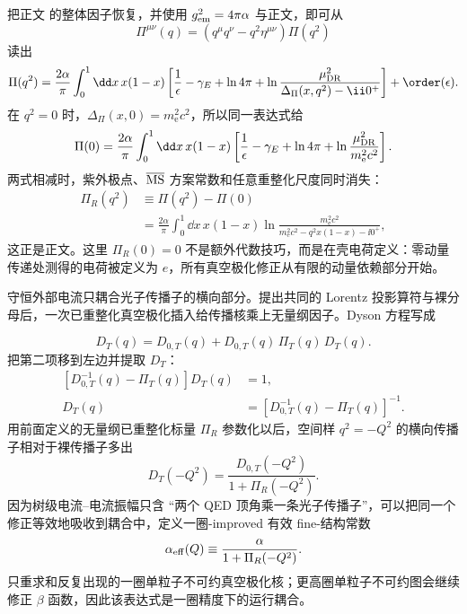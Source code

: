 \begin{derivation}
把正文 的整体因子恢复，并使用 $g_{\rm em}^2=4\pi\alpha$ 与正文，即可从
\[
\Pi^{\mu\nu}(q)
=(q^\mu q^\nu-q^2\eta^{\mu\nu})\Pi(q^2)
\]
读出
\begin{align*}
\Pi(q^2)
=\frac{2\alpha}{\pi}
\int_0^1\dd x\,x(1-x)
\left[
\frac1\epsilon-\gamma_E+\ln4\pi
+\ln\frac{\mu_{\rm DR}^2}
{\Delta_\Pi(x,q^2)-\ii0^+}
\right]
+\order(\epsilon).
\end{align*}
在 $q^2=0$ 时，$\Delta_\Pi(x,0)=m_{\mathrm e}^2c^2$，所以同一表达式给
\begin{align*}
\Pi(0)
=\frac{2\alpha}{\pi}
\int_0^1\dd x\,x(1-x)
\left[
\frac1\epsilon-\gamma_E+\ln4\pi
+\ln\frac{\mu_{\rm DR}^2}{m_{\mathrm e}^2c^2}
\right].
\end{align*}
两式相减时，紫外极点、$\overline{\rm MS}$ 方案常数和任意重整化尺度同时消失：
\begin{align*}
\Pi_R(q^2)
&\equiv\Pi(q^2)-\Pi(0)\\
&=\frac{2\alpha}{\pi}
\int_0^1\dd x\,x(1-x)
\ln\frac{m_{\mathrm e}^2c^2}
{m_{\mathrm e}^2c^2-q^2x(1-x)-\ii0^+},
\end{align*}
这正是正文。这里 $\Pi_R(0)=0$ 不是额外代数技巧，而是在壳电荷定义：零动量传递处测得的电荷被定义为 $e$，所有真空极化修正从有限的动量依赖部分开始。
\end{derivation}


\begin{derivation}
守恒外部电流只耦合光子传播子的横向部分。提出共同的 Lorentz 投影算符与裸分母后，一次已重整化真空极化插入给传播核乘上无量纲因子。Dyson 方程写成

\begin{equation*}
 D_T(q)=D_{0,T}(q)+D_{0,T}(q)\,\Pi_T(q)\,D_T(q).
 \end{equation*}
把第二项移到左边并提取 $D_T$：
\begin{align*}
 \left[D_{0,T}^{-1}(q)-\Pi_T(q)\right]D_T(q)&=1,\\
 D_T(q)&=\left[D_{0,T}^{-1}(q)-\Pi_T(q)\right]^{-1}.
\end{align*}
用前面定义的无量纲已重整化标量 $\Pi_R$ 参数化以后，空间样 $q^2=-Q^2$ 的横向传播子相对于裸传播子多出
\begin{equation*}
 {
 D_T(-Q^2)=\frac{D_{0,T}(-Q^2)}{1+\Pi_R(-Q^2)}.}
 \end{equation*}
因为树级电流--电流振幅只含 ``两个 QED 顶角乘一条光子传播子''，可以把同一个修正等效地吸收到耦合中，定义一圈-improved 有效 fine-结构常数
\begin{equation*}
 {
 \alpha_{\rm eff}(Q)
 \equiv
 \frac{\alpha}{1+\Pi_R(-Q^2)}.}
 \end{equation*}
 只重求和反复出现的一圈单粒子不可约真空极化核；更高圈单粒子不可约图会继续修正 $\beta$ 函数，因此该表达式是一圈精度下的运行耦合。
\end{derivation}

